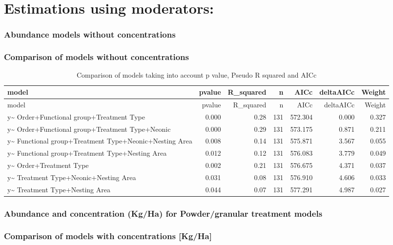 \documentclass[]{elsarticle} %
\begin{document}
\section{Estimations using
moderators:}\label{estimations-using-moderators}

\subsubsection{Abundance models without
concentrations}\label{abundance-models-without-concentrations}

\subsubsection{Comparison of models without
concentrations}\label{comparison-of-models-without-concentrations}

\begin{longtable}[c]{@{}lrrrrrr@{}}
\caption{Comparison of models taking into account p value, Pseudo R
squared and AICc}\tabularnewline
\toprule
model & pvalue & R\_squared & n & AICc & deltaAICc &
Weight\tabularnewline
\midrule
\endfirsthead
\toprule
model & pvalue & R\_squared & n & AICc & deltaAICc &
Weight\tabularnewline
\midrule
\endhead
y\textasciitilde{} Order+Functional group+Treatment Type & 0.000 & 0.28
& 131 & 572.304 & 0.000 & 0.327\tabularnewline
y\textasciitilde{} Order+Functional group+Treatment Type+Neonic & 0.000
& 0.29 & 131 & 573.175 & 0.871 & 0.211\tabularnewline
y\textasciitilde{} Functional group+Treatment Type+Neonic+Nesting Area &
0.008 & 0.14 & 131 & 575.871 & 3.567 & 0.055\tabularnewline
y\textasciitilde{} Functional group+Treatment Type+Nesting Area & 0.012
& 0.12 & 131 & 576.083 & 3.779 & 0.049\tabularnewline
y\textasciitilde{} Order+Treatment Type & 0.002 & 0.21 & 131 & 576.675 &
4.371 & 0.037\tabularnewline
y\textasciitilde{} Treatment Type+Neonic+Nesting Area & 0.031 & 0.08 &
131 & 576.910 & 4.606 & 0.033\tabularnewline
y\textasciitilde{} Treatment Type+Nesting Area & 0.044 & 0.07 & 131 &
577.291 & 4.987 & 0.027\tabularnewline
\bottomrule
\end{longtable}

\subsubsection{Abundance and concentration (Kg/Ha) for Powder/granular
treatment
models}\label{abundance-and-concentration-kgha-for-powdergranular-treatment-models}

\subsubsection{Comparison of models with concentrations
{[}Kg/Ha{]}}\label{comparison-of-models-with-concentrations-kgha}
\end{document}

